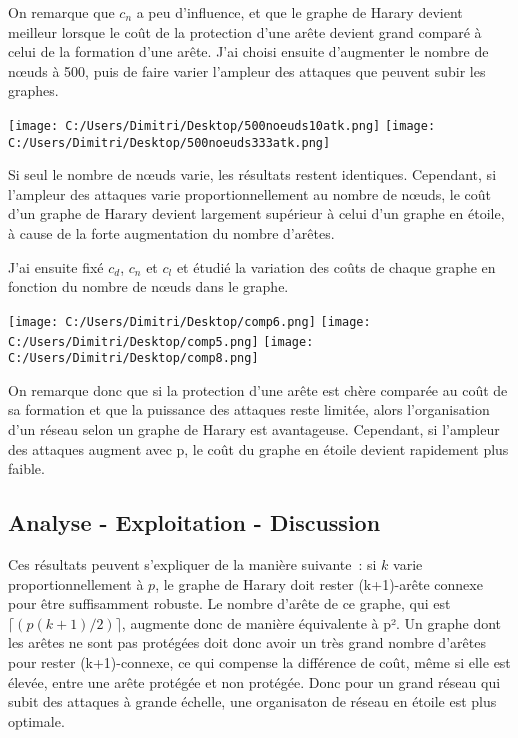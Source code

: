 \documentclass[12pt,a4paper]{article}
\begin{document}
On remarque que $c_{n}$ a peu d'influence, et que le graphe de Harary devient meilleur lorsque le coût de la protection d'une arête devient grand comparé à celui de la formation d'une arête.
J'ai choisi ensuite d'augmenter le nombre de nœuds à 500, puis de faire varier l'ampleur des attaques que peuvent subir les graphes.

\begin{center}
\texttt{[image: C:/Users/Dimitri/Desktop/500noeuds10atk.png]}
\texttt{[image: C:/Users/Dimitri/Desktop/500noeuds333atk.png]}
\end{center}

Si seul le nombre de nœuds varie, les résultats restent identiques. Cependant, si l'ampleur des attaques varie proportionnellement au nombre de nœuds, le coût d'un graphe de Harary devient largement supérieur à celui d'un graphe en étoile, à cause de la forte augmentation du nombre d'arêtes.

J'ai ensuite fixé $c_{d}$, $c_{n}$ et $c_{l}$ et étudié la variation des coûts de chaque graphe en fonction du nombre de nœuds dans le graphe.

\begin{center}
\texttt{[image: C:/Users/Dimitri/Desktop/comp6.png]}
\texttt{[image: C:/Users/Dimitri/Desktop/comp5.png]}
\texttt{[image: C:/Users/Dimitri/Desktop/comp8.png]}
\end{center}

On remarque donc que si la protection d'une arête est chère comparée au coût de sa formation et que la puissance des attaques reste limitée, alors l'organisation d'un réseau selon un graphe de Harary est   avantageuse. Cependant, si l'ampleur des attaques augment avec p, le coût du graphe en étoile devient rapidement plus faible.



\subsection{Analyse - Exploitation - Discussion}
Ces résultats peuvent s'expliquer de la manière suivante : si $k$ varie proportionnellement à $p$, le graphe de Harary doit rester (k+1)-arête connexe pour être suffisamment robuste. Le nombre d'arête de ce graphe, qui est $\lceil (p(k+1)/2) \rceil$, augmente donc de manière équivalente à  p². Un graphe dont les arêtes ne sont pas protégées doit donc avoir un très grand nombre d'arêtes pour rester (k+1)-connexe, ce qui compense la différence de coût, même si elle est élevée, entre une arête protégée et non protégée. Donc pour un grand réseau qui subit des attaques à grande échelle, une organisaton de réseau en étoile est plus optimale.
\end{document}
